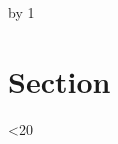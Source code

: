 \documentclass[11pt]{article}
\begin{document}
\loop
  \advance\kachotestcount by 1
  \section{Section \the\kachotestcount}
  \lipsum[1-15]
\ifnum\kachotestcount<20 \repeat
\end{document}
